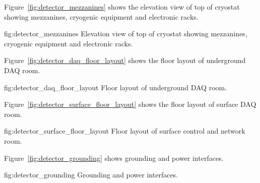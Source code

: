 Figure~\ref{fig:detector_mezzanines} shows the elevation view of top
of cryostat showing mezzanines, cryogenic equipment and electronic
racks.
\begin{dunefigure}{fig:detector_mezzanines}
  {Elevation view of top of cryostat showing mezzanines, cryogenic
    equipment and electronic racks.}
\end{dunefigure}

Figure~\ref{fig:detector_daq_floor_layout} shows the floor layout of underground DAQ room.
\begin{dunefigure}{fig:detector_daq_floor_layout}
  {Floor layout of underground DAQ room.}
\end{dunefigure}

Figure~\ref{fig:detector_surface_floor_layout} shows the floor layout
of surface DAQ room.
\begin{dunefigure}{fig:detector_surface_floor_layout} {Floor layout of surface control and network room.}
\end{dunefigure}

Figure~\ref{fig:detector_grounding} shows grounding and power interfaces.
\begin{dunefigure}{fig:detector_grounding} {Grounding and power interfaces.}
\end{dunefigure}





